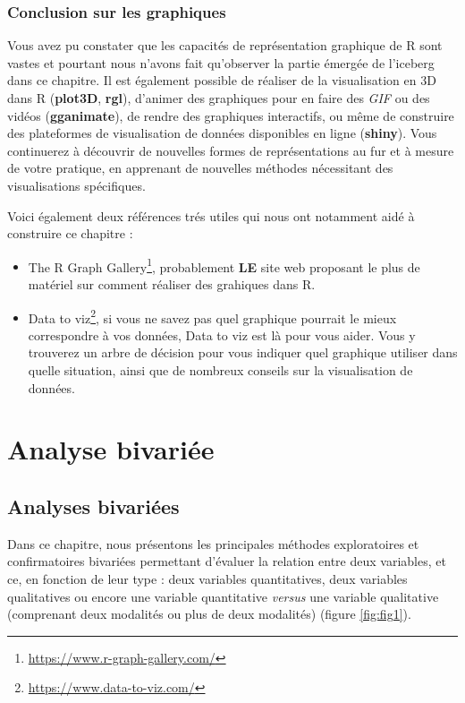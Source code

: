 \documentclass[
  11pt,
  french,
]{book}
\providecommand{\tightlist}{%
  \setlength{\itemsep}{0pt}\setlength{\parskip}{0pt}}
\renewcommand{\href}[2]{#2\footnote{\url{#1}}}
\begin{document}
\hypertarget{sect036}{%
\section{Conclusion sur les graphiques}\label{sect036}}

Vous avez pu constater que les capacités de représentation graphique de R sont vastes et pourtant nous n'avons fait qu'observer la partie émergée de l'iceberg dans ce chapitre. Il est également possible de réaliser de la visualisation en 3D dans R (\textbf{plot3D}, \textbf{rgl}), d'animer des graphiques pour en faire des \emph{GIF} ou des vidéos (\textbf{gganimate}), de rendre des graphiques interactifs, ou même de construire des plateformes de visualisation de données disponibles en ligne (\textbf{shiny}). Vous continuerez à découvrir de nouvelles formes de représentations au fur et à mesure de votre pratique, en apprenant de nouvelles méthodes nécessitant des visualisations spécifiques.

Voici également deux références trés utiles qui nous ont notamment aidé à construire ce chapitre :

\begin{itemize}
\tightlist
\item
  \href{https://www.r-graph-gallery.com/}{The R Graph Gallery}, probablement \textbf{LE} site web proposant le plus de matériel sur comment réaliser des grahiques dans R.
\item
  \href{https://www.data-to-viz.com/}{Data to viz}, si vous ne savez pas quel graphique pourrait le mieux correspondre à vos données, Data to viz est là pour vous aider. Vous y trouverez un arbre de décision pour vous indiquer quel graphique utiliser dans quelle situation, ainsi que de nombreux conseils sur la visualisation de données.
\end{itemize}

\hypertarget{part-analyse-bivariuxe9e}{%
\part{Analyse bivariée}\label{part-analyse-bivariuxe9e}}

\hypertarget{chap04}{%
\chapter{Analyses bivariées}\label{chap04}}

Dans ce chapitre, nous présentons les principales méthodes exploratoires et confirmatoires bivariées permettant d'évaluer la relation entre deux variables, et ce, en fonction de leur type : deux variables quantitatives, deux variables qualitatives ou encore une variable quantitative \emph{versus} une variable qualitative (comprenant deux modalités ou plus de deux modalités) (figure \ref{fig:fig1}).
\end{document}
